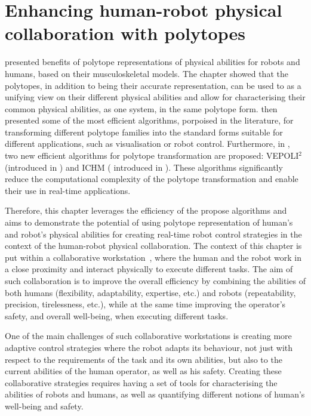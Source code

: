 
\chapter{Enhancing human-robot physical collaboration with polytopes}
\label{ch:physical_interaction}

 presented benefits of polytope representations of physical abilities for robots and humans, based on their musculoskeletal models. The chapter showed that the polytopes, in addition to being their accurate representation, can be used to as a unifying view on their different physical abilities and allow for characterising their common physical abilities, as one system, in the same polytope form.  then presented some of the most efficient algorithms, porpoised in the literature, for transforming different polytope families into the standard forms suitable for different applications, such as visualisation or robot control. Furthermore, in , two new efficient algorithms for polytope transformation are proposed: VEPOLI$^2$ (introduced in ) and ICHM ( introduced in ). These algorithms significantly reduce the computational complexity of the polytope transformation and enable their use in real-time applications.

Therefore, this chapter leverages the efficiency of the propose algorithms and aims to demonstrate the potential of using polytope representation of human's and robot's physical abilities for creating real-time robot control strategies in the context of the human-robot physical collaboration.  
The context of this chapter is put within a collaborative workstation~\cite{SIMOES2022workplace}, where the human and the robot work in a close proximity and interact physically to execute different tasks. The aim of such collaboration is to improve the overall efficiency by combining the abilities of both humans (flexibility, adaptability, expertise, etc.) and robots (repeatability, precision, tirelessness, etc.), while at the same time improving the operator's safety, and overall well-being, when executing different tasks. 

One of the main challenges of such collaborative workstations is creating more adaptive control strategies where the robot adapts its behaviour, not just with respect to the requirements of the task and its own abilities, but also to the current abilities of the human operator, as well as his safety. Creating these collaborative strategies requires having a set of tools for characterising the abilities of robots and humans, as well as quantifying different notions of human's well-being and safety. 


